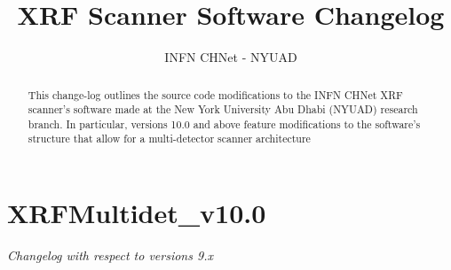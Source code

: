 \documentclass[a4paper,12pt]{article}
\title{\textbf{XRF Scanner Software Changelog}}
\author{INFN CHNet - NYUAD}
\date{}
\begin{document}
\maketitle

\begin{abstract}
	This change-log outlines the source code modifications to the INFN CHNet XRF scanner's software made at the New York University Abu Dhabi (NYUAD) research branch. In particular, versions 10.0 and above feature modifications to the software's structure that allow for a multi-detector scanner architecture
\end{abstract}

\tableofcontents
\clearpage

\section{XRFMultidet\_v10.0}
\textit{Changelog with respect to versions 9.x}
\end{document}

